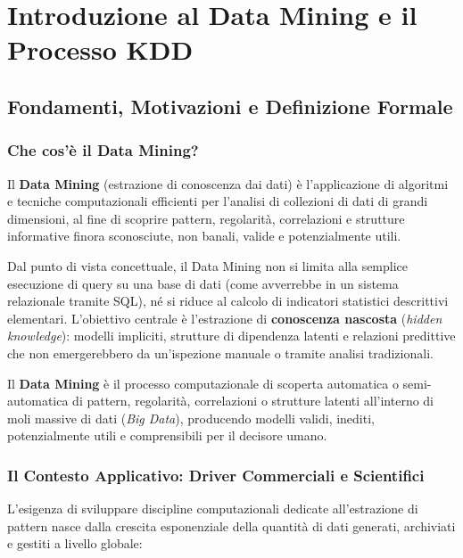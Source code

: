 \chapter{Introduzione al Data Mining e il Processo KDD}
\label{ch:intro-data-mining}

\section{Fondamenti, Motivazioni e Definizione Formale}

\subsection{Che cos'\`e il Data Mining?}
Il \textbf{Data Mining} (estrazione di conoscenza dai dati) \`e l'applicazione di algoritmi e tecniche computazionali efficienti per l'analisi di collezioni di dati di grandi dimensioni, al fine di scoprire pattern, regolarit\`a, correlazioni e strutture informative finora sconosciute, non banali, valide e potenzialmente utili.

Dal punto di vista concettuale, il Data Mining non si limita alla semplice esecuzione di query su una base di dati (come avverrebbe in un sistema relazionale tramite SQL), n\'e si riduce al calcolo di indicatori statistici descrittivi elementari. L'obiettivo centrale \`e l'estrazione di \textbf{conoscenza nascosta} (\textit{hidden knowledge}): modelli impliciti, strutture di dipendenza latenti e relazioni predittive che non emergerebbero da un'ispezione manuale o tramite analisi tradizionali.

\begin{definition}
Il \textbf{Data Mining} \`e il processo computazionale di scoperta automatica o semi-automatica di pattern, regolarit\`a, correlazioni o strutture latenti all'interno di moli massive di dati (\textit{Big Data}), producendo modelli validi, inediti, potenzialmente utili e comprensibili per il decisore umano.
\end{definition}

\subsection{Il Contesto Applicativo: Driver Commerciali e Scientifici}
L'esigenza di sviluppare discipline computazionali dedicate all'estrazione di pattern nasce dalla crescita esponenziale della quantit\`a di dati generati, archiviati e gestiti a livello globale:

